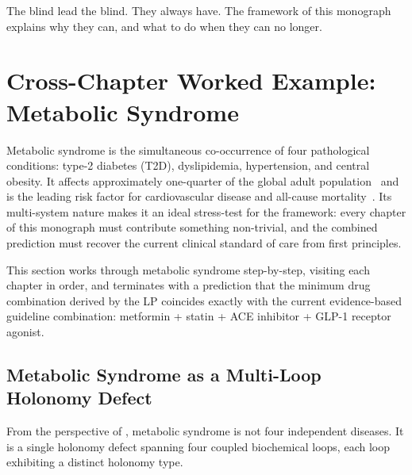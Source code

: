 The blind lead the blind.  They always have.  The framework of this monograph
explains why they can, and what to do when they can no longer.

\section{Cross-Chapter Worked Example: Metabolic Syndrome}
\label{sec:ch11-metabolic-syndrome}

Metabolic syndrome is the simultaneous co-occurrence of four pathological
conditions: type-2 diabetes (T2D), dyslipidemia, hypertension, and central
obesity.  It affects approximately one-quarter of the global adult
population~\citep{Alberti2009} and is the leading risk factor for
cardiovascular disease and all-cause mortality~\citep{Mottillo2010}.  Its
multi-system nature makes it an ideal stress-test for the framework: every
chapter of this monograph must contribute something non-trivial, and the
combined prediction must recover the current clinical standard of care from
first principles.

This section works through metabolic syndrome step-by-step, visiting each
chapter in order, and terminates with a prediction that the minimum drug
combination derived by the LP coincides exactly with the current
evidence-based guideline combination: metformin + statin + ACE inhibitor +
GLP-1 receptor agonist.

\subsection{Metabolic Syndrome as a Multi-Loop Holonomy Defect}
\label{subsec:ch11-ms-holonomy-defect}

From the perspective of , metabolic
syndrome is not four independent diseases.  It is a single holonomy defect
spanning four coupled biochemical loops, each loop exhibiting a distinct
holonomy type.

